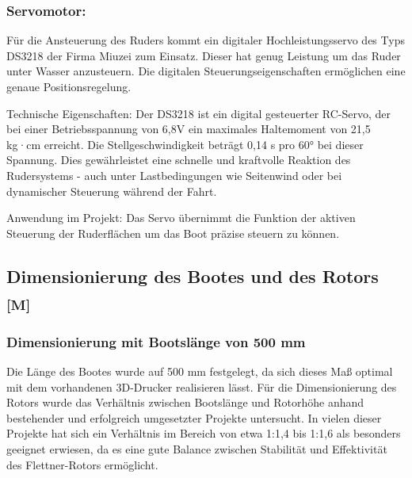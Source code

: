 \documentclass[a4paper,12pt]{article}
\begin{document}
    
    \subsubsection{Servomotor:}
    Für die Ansteuerung des Ruders kommt ein digitaler Hochleistungsservo des Typs DS3218 der Firma Miuzei zum Einsatz. Dieser hat genug Leistung um das Ruder unter Wasser anzusteuern. Die digitalen Steuerungseigenschaften ermöglichen eine genaue Positionsregelung.\cite{Datenblatt_Servomotor}\newline

    Technische Eigenschaften: Der DS3218 ist ein digital gesteuerter RC-Servo, der bei einer Betriebsspannung von 6,8V ein maximales Haltemoment von 21,5 kg·cm erreicht. Die Stellgeschwindigkeit beträgt 0,14 s pro 60° bei dieser Spannung. Dies gewährleistet eine schnelle und kraftvolle Reaktion des Rudersystems - auch unter Lastbedingungen wie Seitenwind oder bei dynamischer Steuerung während der Fahrt.\cite{Datenblatt_Servomotor}\newline
    
    Anwendung im Projekt: Das Servo übernimmt die Funktion der aktiven Steuerung der Ruderflächen um das Boot präzise steuern zu können.
    
    

\newpage

\subsection{\texorpdfstring{Dimensionierung des Bootes und des Rotors \textsubscript{[M]}}{Dimensionierung des Bootes und des Rotors [M]}}

\subsubsection{Dimensionierung mit Bootslänge von 500 mm}

Die Länge des Bootes wurde auf 500 mm festgelegt, da sich dieses Maß optimal mit dem vorhandenen 3D-Drucker realisieren lässt. Für die Dimensionierung des Rotors wurde das Verhältnis zwischen Bootslänge und Rotorhöhe anhand bestehender und erfolgreich umgesetzter Projekte untersucht. In vielen dieser Projekte hat sich ein Verhältnis im Bereich von etwa 1:1,4 bis 1:1,6 als besonders geeignet erwiesen, da es eine gute Balance zwischen Stabilität und Effektivität des Flettner-Rotors ermöglicht.\cite{Flettner_Uni_Flensburg}\newline
\end{document}
